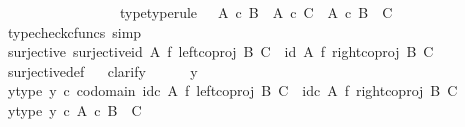 \begin{isabellebody}
\ \ \ \ \ \ \ \ \ \ \ \ \ \ \ \ \ {\isasymphi}{\isacharunderscore}{\kern0pt}type{\isacharbrackleft}{\kern0pt}type{\isacharunderscore}{\kern0pt}rule{\isacharbrackright}{\kern0pt}{\isacharcolon}{\kern0pt}\ {\isachardoublequoteopen}{\isasymphi}\ {\isacharcolon}{\kern0pt}\ {\isacharparenleft}{\kern0pt}A\ {\isasymtimes}\isactrlsub c\ B{\isacharparenright}{\kern0pt}\ {\isasymCoprod}\ {\isacharparenleft}{\kern0pt}A\ {\isasymtimes}\isactrlsub c\ C{\isacharparenright}{\kern0pt}\ {\isasymrightarrow}\ A\ {\isasymtimes}\isactrlsub c\ {\isacharparenleft}{\kern0pt}B\ {\isasymCoprod}\ C{\isacharparenright}{\kern0pt}{\isachardoublequoteclose}\isanewline
\ \ \ \ \isamarkupfalse%
\ {\isacharparenleft}{\kern0pt}typecheck{\isacharunderscore}{\kern0pt}cfuncs{\isacharcomma}{\kern0pt}\ simp{\isacharparenright}{\kern0pt}\isanewline
\ \ \isamarkupfalse%
\ surjective{\isacharcolon}{\kern0pt}\ {\isachardoublequoteopen}surjective{\isacharparenleft}{\kern0pt}{\isacharparenleft}{\kern0pt}id\ A\ {\isasymtimes}\isactrlsub f\ left{\isacharunderscore}{\kern0pt}coproj\ B\ C{\isacharparenright}{\kern0pt}\ {\isasymamalg}\ {\isacharparenleft}{\kern0pt}id\ A\ {\isasymtimes}\isactrlsub f\ right{\isacharunderscore}{\kern0pt}coproj\ B\ C{\isacharparenright}{\kern0pt}{\isacharparenright}{\kern0pt}{\isachardoublequoteclose}\isanewline
\ \ \ \ \isamarkupfalse%
\ surjective{\isacharunderscore}{\kern0pt}def\isanewline
\ \ \isamarkupfalse%
{\isacharparenleft}{\kern0pt}clarify{\isacharparenright}{\kern0pt}\isanewline
\ \ \ \ \isamarkupfalse%
\ y\ \isanewline
\ \ \ \ \isamarkupfalse%
\ y{\isacharunderscore}{\kern0pt}type{\isacharcolon}{\kern0pt}\ {\isachardoublequoteopen}y\ {\isasymin}\isactrlsub c\ codomain\ {\isacharparenleft}{\kern0pt}{\isacharparenleft}{\kern0pt}id\isactrlsub c\ A\ {\isasymtimes}\isactrlsub f\ left{\isacharunderscore}{\kern0pt}coproj\ B\ C{\isacharparenright}{\kern0pt}\ {\isasymamalg}\ {\isacharparenleft}{\kern0pt}id\isactrlsub c\ A\ {\isasymtimes}\isactrlsub f\ right{\isacharunderscore}{\kern0pt}coproj\ B\ C{\isacharparenright}{\kern0pt}{\isacharparenright}{\kern0pt}{\isachardoublequoteclose}\isanewline
\ \ \ \ \isamarkupfalse%
\ \isamarkupfalse%
\ y{\isacharunderscore}{\kern0pt}type{}{\isacharcolon}{\kern0pt}\ {\isachardoublequoteopen}y\ {\isasymin}\isactrlsub c\ A\ {\isasymtimes}\isactrlsub c\ {\isacharparenleft}{\kern0pt}B\ {\isasymCoprod}\ C{\isacharparenright}{\kern0pt}{\isachardoublequoteclose}\isanewline
\ \ \ \ \ \ \isamarkupfalse%

\end{isabellebody}
